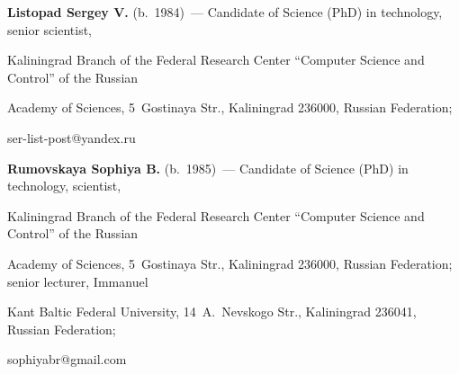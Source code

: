    


   \noindent


   \textbf{Listopad Sergey V.} (b.\ 1984)~--- Candidate of Science (PhD) in technology, senior scientist, 


Kaliningrad Branch of the Federal Research Center ``Computer Science and Control'' of the Russian 


Academy of Sciences, 5~Gostinaya Str., Kaliningrad 236000, Russian Federation;  


\mbox{ser-list-post@yandex.ru}





  \vspace*{3pt}


  


   


   \noindent


   \textbf{Rumovskaya Sophiya B.} (b.\ 1985)~--- Candidate of Science (PhD) in technology, scientist, 


Kaliningrad Branch of the Federal Research Center ``Computer Science and Control'' of the Russian 


Academy of Sciences, 5~Gostinaya Str., Kaliningrad 236000, Russian Federation; senior lecturer, Immanuel 


Kant Baltic Federal University, 14~A.~Nevskogo Str., Kaliningrad 236041, Russian Federation; 


\mbox{sophiyabr@gmail.com}


   


 


   


   


   


   \label{end\stat}


   


   \renewcommand{\bibname}{\protect\rm Литература} 


    


    



